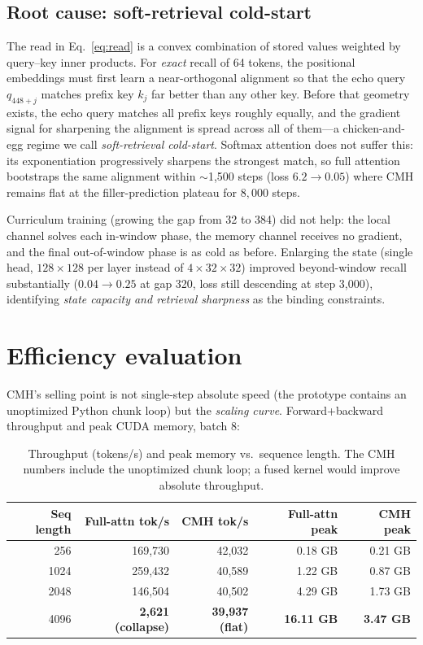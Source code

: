 \documentclass[11pt]{article}
\newcommand{\cmh}{CMH}
\begin{document}
\subsection{Root cause: soft-retrieval cold-start}

The read in Eq.~\eqref{eq:read} is a convex combination of stored values weighted by
query--key inner products. For \emph{exact} recall of 64 tokens, the positional
embeddings must first learn a near-orthogonal alignment so that the echo query
$q_{448+j}$ matches prefix key $k_j$ far better than any other key. Before that geometry
exists, the echo query matches all prefix keys roughly equally, and the gradient signal
for sharpening the alignment is spread across all of them---a chicken-and-egg regime we
call \emph{soft-retrieval cold-start}. Softmax attention does not suffer this: its
exponentiation progressively sharpens the strongest match, so full attention bootstraps
the same alignment within $\sim$1,500 steps (loss $6.2 \to 0.05$) where \cmh{} remains
flat at the filler-prediction plateau for $8{,}000$ steps.

Curriculum training (growing the gap from 32 to 384) did not help: the local channel
solves each in-window phase, the memory channel receives no gradient, and the final
out-of-window phase is as cold as before. Enlarging the state (single head,
$128{\times}128$ per layer instead of $4{\times}32{\times}32$) improved beyond-window
recall substantially ($0.04 \to 0.25$ at gap 320, loss still descending at step 3{,}000),
identifying \emph{state capacity and retrieval sharpness} as the binding constraints.

\section{Efficiency evaluation}\label{sec:efficiency}

\cmh{}'s selling point is not single-step absolute speed (the prototype contains an
unoptimized Python chunk loop) but the \emph{scaling curve}. Forward+backward
throughput and peak CUDA memory, batch 8:

\begin{table}[h]
\centering
\caption{Throughput (tokens/s) and peak memory vs.\ sequence length. The \cmh{} numbers
include the unoptimized chunk loop; a fused kernel would improve absolute throughput.}
\label{tab:efficiency}
\begin{tabular}{rrrrr}
\toprule
Seq length & Full-attn tok/s & \cmh{} tok/s & Full-attn peak & \cmh{} peak \\
\midrule
256  & 169{,}730 & 42{,}032 & 0.18 GB & 0.21 GB \\
1024 & 259{,}432 & 40{,}589 & 1.22 GB & 0.87 GB \\
2048 & 146{,}504 & 40{,}502 & 4.29 GB & 1.73 GB \\
4096 & \textbf{2{,}621 (collapse)} & \textbf{39{,}937 (flat)} & \textbf{16.11 GB} & \textbf{3.47 GB} \\
\bottomrule
\end{tabular}
\end{table}
\end{document}

